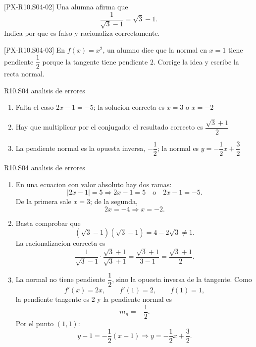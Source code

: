 \begin{exercise}{[PX-R10.S04-02] Una alumna afirma que
\[
\frac{1}{\sqrt{3}-1}=\sqrt{3}-1.
\]
Indica por que es falso y racionaliza correctamente.}
\end{exercise}

\begin{exercise}{[PX-R10.S04-03] En \(f(x)=x^2\), un alumno dice que la normal en \(x=1\)
tiene pendiente \(\dfrac{1}{2}\) porque la tangente tiene pendiente \(2\). Corrige la idea y
escribe la recta normal.}
\end{exercise}

\begin{shortanswer}{R10.S04 analisis de errores}
\begin{enumerate}[label=\textbf{PX-R10.S04-\arabic*:}, leftmargin=*]
  \item Falta el caso \(2x-1=-5\); la solucion correcta es \(x=3\) o \(x=-2\)
  \item Hay que multiplicar por el conjugado; el resultado correcto es
  \(\dfrac{\sqrt{3}+1}{2}\)
  \item La pendiente normal es la opuesta inversa, \(-\dfrac{1}{2}\); la normal es
  \(y=-\dfrac{1}{2}x+\dfrac{3}{2}\)
\end{enumerate}
\end{shortanswer}

\begin{fullsolution}{R10.S04 analisis de errores}
\begin{enumerate}[label=\textbf{PX-R10.S04-\arabic*:}, leftmargin=*]
  \item En una ecuacion con valor absoluto hay dos ramas:
  \[
  |2x-1|=5 \Longrightarrow 2x-1=5 \quad \text{o}\quad 2x-1=-5.
  \]
  De la primera sale \(x=3\); de la segunda,
  \[
  2x=-4 \Longrightarrow x=-2.
  \]
  \item Basta comprobar que
  \[
  (\sqrt{3}-1)(\sqrt{3}-1)=4-2\sqrt{3}\neq 1.
  \]
  La racionalizacion correcta es
  \[
  \frac{1}{\sqrt{3}-1}\cdot \frac{\sqrt{3}+1}{\sqrt{3}+1}
  =\frac{\sqrt{3}+1}{3-1}
  =\frac{\sqrt{3}+1}{2}.
  \]
  \item La normal no tiene pendiente \(\dfrac{1}{2}\), sino la opuesta inversa de la tangente.
  Como
  \[
  f'(x)=2x,\qquad f'(1)=2,\qquad f(1)=1,
  \]
  la pendiente tangente es \(2\) y la pendiente normal es
  \[
  m_n=-\frac{1}{2}.
  \]
  Por el punto \((1,1)\):
  \[
  y-1=-\frac{1}{2}(x-1)
  \Longrightarrow y=-\frac{1}{2}x+\frac{3}{2}.
  \]
\end{enumerate}
\end{fullsolution}

